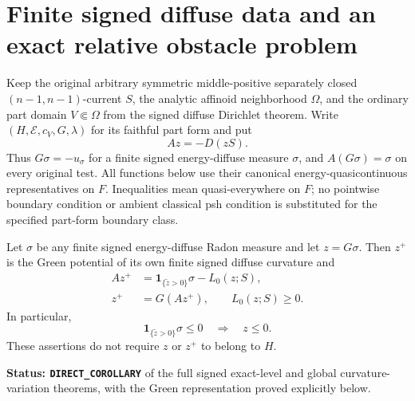 \section{Finite signed diffuse data and an exact relative obstacle problem}
\label{sec:r11-diffuse-obstacle-contact}

Keep the original arbitrary symmetric middle-positive separately
closed $(n-1,n-1)$-current $S$, the analytic affinoid neighborhood
$\Omega$, and the ordinary part domain $V\Subset\Omega$ from the
signed diffuse Dirichlet theorem.  Write $(H,\mathcal E,c_V,G,\lambda)$
for its faithful part form and put
\[
                              Az=-D(zS).
 \tag{OB1}
\]
Thus $G\sigma=-u_\sigma$ for a finite signed energy-diffuse measure
$\sigma$, and $A(G\sigma)=\sigma$ on every original test.
All functions below use their canonical energy-quasicontinuous
representatives on $F$.  Inequalities mean quasi-everywhere on $F$;
no pointwise boundary condition or ambient classical psh condition
is substituted for the specified part-form boundary class.

\begin{lemma}
\label{lem:r11-diffuse-positive-part-Green}
Let $\sigma$ be any finite signed energy-diffuse Radon measure and
let $z=G\sigma$.  Then $z^+$ is the Green potential of its own finite
signed diffuse curvature and
\[
 \begin{split}
 Az^+&=\mathbf1_{\{\widetilde z>0\}}\sigma-L_0(z;S),\\
 z^+&=G(Az^+),\qquad L_0(z;S)\ge0.
 \end{split}
 \tag{OB2}
\]
In particular,
\[
        \mathbf1_{\{\widetilde z>0\}}\sigma\le0
                              \quad\Longrightarrow\quad z\le0.
 \tag{OB3}
\]
These assertions do not require $z$ or $z^+$ to belong to $H$.
\end{lemma}

\noindent\textbf{Status: \texttt{DIRECT\_COROLLARY}} of the full
signed exact-level and global curvature-variation theorems, with the
Green representation proved explicitly below.

